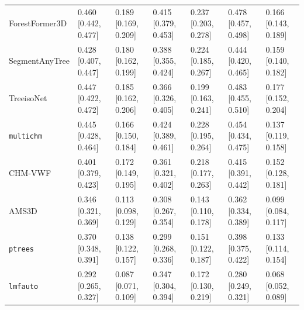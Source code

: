 \documentclass[10pt,a4paper]{article}
\begin{document}
{\begin{xltabular}{\textwidth}{LLLLLLL}
ForestFormer3D & 0.460 [0.442, 0.477] & 0.189 [0.169, 0.209] & 0.415 [0.379, 0.453] & 0.237 [0.203, 0.278] & 0.478 [0.457, 0.498] & 0.166 [0.143, 0.189] \\
SegmentAnyTree & 0.428 [0.407, 0.447] & 0.180 [0.162, 0.199] & 0.388 [0.355, 0.424] & 0.224 [0.185, 0.267] & 0.444 [0.420, 0.465] & 0.159 [0.140, 0.182] \\
TreeisoNet & 0.447 [0.422, 0.472] & 0.185 [0.162, 0.206] & 0.366 [0.326, 0.405] & 0.199 [0.163, 0.241] & 0.483 [0.455, 0.510] & 0.177 [0.152, 0.204] \\
\texttt{multichm} & 0.445 [0.428, 0.464] & 0.166 [0.150, 0.184] & 0.424 [0.389, 0.461] & 0.228 [0.195, 0.264] & 0.454 [0.434, 0.475] & 0.137 [0.119, 0.158] \\
CHM-VWF & 0.401 [0.379, 0.423] & 0.172 [0.149, 0.195] & 0.361 [0.321, 0.402] & 0.218 [0.177, 0.263] & 0.415 [0.391, 0.442] & 0.152 [0.128, 0.181] \\
AMS3D & 0.346 [0.321, 0.369] & 0.113 [0.098, 0.129] & 0.308 [0.267, 0.354] & 0.143 [0.110, 0.178] & 0.362 [0.334, 0.389] & 0.099 [0.084, 0.117] \\
\texttt{ptrees} & 0.370 [0.348, 0.391] & 0.138 [0.122, 0.157] & 0.299 [0.268, 0.336] & 0.151 [0.122, 0.187] & 0.398 [0.375, 0.422] & 0.133 [0.114, 0.154] \\
\texttt{lmfauto} & 0.292 [0.265, 0.327] & 0.087 [0.071, 0.109] & 0.347 [0.304, 0.394] & 0.172 [0.130, 0.219] & 0.280 [0.249, 0.321] & 0.068 [0.052, 0.089] \\
\end{xltabular}
}
\end{document}

